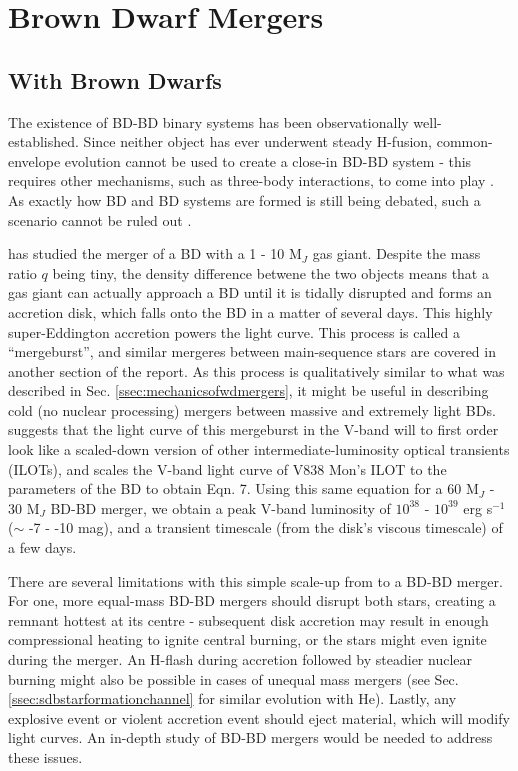 \section{Brown Dwarf Mergers}

\subsection{With Brown Dwarfs}

The existence of BD-BD binary systems has been observationally well-established.  Since neither object has ever underwent steady H-fusion, common-envelope evolution cannot be used to create a close-in BD-BD system - this requires other mechanisms, such as three-body interactions, to come into play \citep{dangkr06,bearks11}.  As exactly how BD and BD systems are formed is still being debated, such a scenario cannot be ruled out \citep{bearks11}.

\cite{bearks11} has studied the merger of a BD with a 1 - 10 M$_{J}$ gas giant.  Despite the mass ratio $q$ being tiny, the density difference betwene the two objects means that a gas giant can actually approach a BD until it is tidally disrupted and forms an accretion disk, which falls onto the BD in a matter of several days.  This highly super-Eddington accretion powers the light curve.  This process is called a ``mergeburst'', and similar mergeres between main-sequence stars are covered in another section of the report.  As this process is qualitatively similar to what was described in Sec. \ref{ssec:mechanicsofwdmergers}, it might be useful in describing cold (no nuclear processing) mergers between massive and extremely light BDs.  \citeauthor{bearks11} suggests that the light curve of this mergeburst in the V-band will to first order look like a scaled-down version of other intermediate-luminosity optical transients (ILOTs), and scales the V-band light curve of V838 Mon's ILOT to the parameters of the BD to obtain \citeauthor{bearks11} Eqn. 7.  Using this same equation for a 60 M$_{J}$ - 30 M$_{J}$ BD-BD merger, we obtain a peak V-band luminosity of $10^{38}$ - $10^{39}$ erg s$^{-1}$ ($\sim$ -7 - -10 mag), and a transient timescale (from the disk's viscous timescale) of a few days.

There are several limitations with this simple scale-up from \citeauthor{bearks11} to a BD-BD merger.  For one, more equal-mass BD-BD mergers should disrupt both stars, creating a remnant hottest at its centre - subsequent disk accretion may result in enough compressional heating to ignite central burning, or the stars might even ignite during the merger.  An H-flash during accretion followed by steadier nuclear burning might also be possible in cases of unequal mass mergers (see Sec. \ref{ssec:sdbstarformationchannel} for similar evolution with He).  Lastly, any explosive event or violent accretion event should eject material, which will modify light curves.  An in-depth study of BD-BD mergers would be needed to address these issues.

